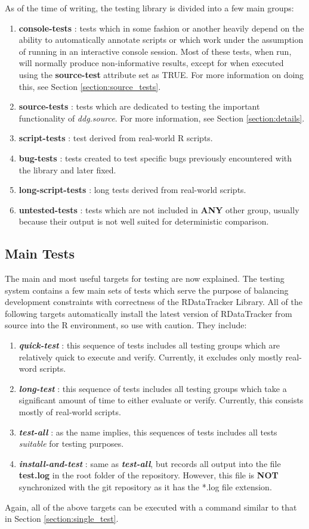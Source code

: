 \documentclass[12pt]{article}
\begin{document}
As of the time of writing, the testing library is divided into a few main groups:
\begin{enumerate}
\item \textbf{console-tests} : tests which in some fashion or another heavily depend on the ability to automatically annotate scripts or which work under the assumption of running in an interactive console session. Most of these tests, when run, will normally produce non-informative results, except for when executed using the \textbf{source-test} attribute set as TRUE. For more information on doing this, see Section \ref{section:source_tests}.
\item \textbf{source-tests} : tests which are dedicated to testing the important functionality of \textit{ddg.source}. For more information, see Section \ref{section:details}.
\item \textbf{script-tests} : test derived from real-world R scripts.
\item \textbf{bug-tests} : tests created to test specific bugs previously encountered with the library and later fixed.
\item \textbf{long-script-tests} : long tests derived from real-world scripts.
\item \textbf{untested-tests} : tests which are not included in \textbf{ANY} other group, usually because their output is not well suited for deterministic comparison.
\end{enumerate}

\subsection{Main Tests}
The main and most useful targets for testing are now explained. The testing system contains a few main sets of tests which serve the purpose of balancing development constraints with correctness of the RDataTracker Library. All of the following targets automatically install the latest version of RDataTracker from source into the R environment, so use with caution. They include:
\begin{enumerate}
\item \textbf{\textit{quick-test}} : this sequence of tests includes all testing groups which are relatively quick to execute and verify. Currently, it excludes only mostly real-word scripts.
\item \textbf{\textit{long-test}} : this sequence of tests includes all testing groups which take a significant amount of time to either evaluate or verify. Currently, this consists mostly of real-world scripts.
\item \textbf{\textit{test-all}} : as the name implies, this sequences of tests includes all tests \textit{suitable} for testing purposes.
\item \textbf{\textit{install-and-test}} : same as \textbf{\textit{test-all}}, but records all output into the file \textbf{test.log} in the root folder of the repository. However, this file is \textbf{NOT} synchronized with the git repository as it has the *.log file extension.
\end{enumerate} 
Again, all of the above targets can be executed with a command similar to that in Section \ref{section:single_test}.
\end{document}

